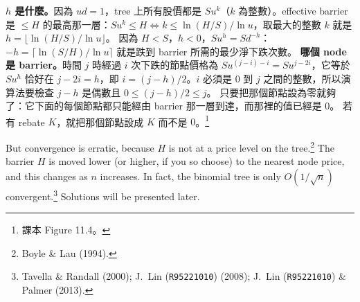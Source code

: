 
\begin{note}
	\textbf{$h$ 是什麼。}因為 $ud=1$，tree 上所有股價都是 $Su^{k}$（$k$ 為整數）。effective barrier 是 $\le H$ 的最高那一層：$Su^{k}\le H\iff k\le\ln(H/S)/\ln u$，取最大的整數 $k$ 就是 $h=\lfloor\ln(H/S)/\ln u\rfloor$。
	因為 $H<S$，$h<0$，$Su^{h}=Sd^{-h}$：$-h=\lceil\ln(S/H)/\ln u\rceil$ 就是跌到 barrier 所需的最少淨下跌次數。
	\textbf{哪個 node 是 barrier。}時間 $j$ 時經過 $i$ 次下跌的節點價格為 $Su^{(j-i)-i}=Su^{j-2i}$，它等於 $Su^{h}$ 恰好在 $j-2i=h$，即 $i=(j-h)/2$。$i$ 必須是 $0$ 到 $j$ 之間的整數，所以演算法要檢查 $j-h$ 是偶數且 $0\le(j-h)/2\le j$。
	只要把那個節點設為零就夠了：它下面的每個節點都只能經由 barrier 那一層到達，而那裡的值已經是 $0$。
	若有 rebate $K$，就把那個節點設成 $K$ 而不是 $0$。\footnote{課本 Figure 11.4。}
\end{note}
\suppend


But convergence is erratic, because $H$ is not at a price level on the tree.\footnote{Boyle \& Lau (1994).}
The barrier $H$ is moved lower (or higher, if you so choose) to the nearest node price, and this  changes as $n$ increases.
In fact, the binomial tree is only $O(1/\sqrt{n})$ convergent.\footnote{Tavella \& Randall (2000); J.~Lin (\texttt{R95221010}) (2008); J.~Lin (\texttt{R95221010}) \& Palmer (2013).}
Solutions will be presented later.

\suppstart
{}
\suppend

